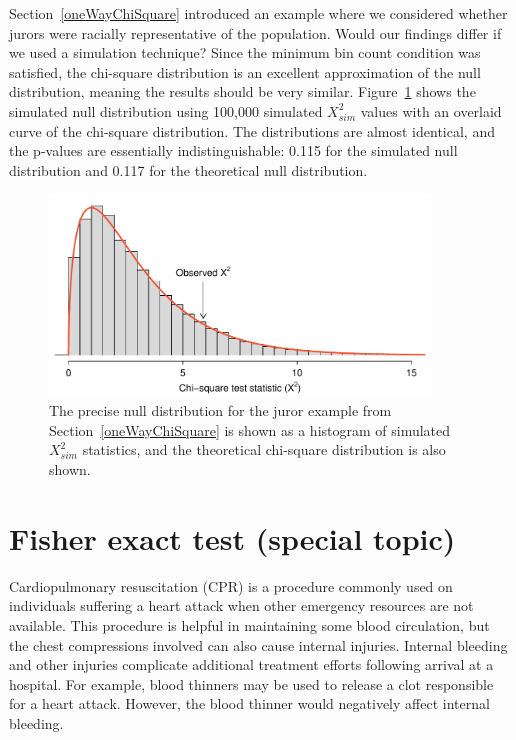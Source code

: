 \begin{example}{Section~\ref{oneWayChiSquare} introduced an example where we considered whether jurors were racially representative of the population. Would our findings differ if we used a simulation technique?}
Since the minimum bin count condition was satisfied, the chi-square distribution is an excellent approximation of the null distribution, meaning the results should be very similar. Figure~\ref{jurorChiSquareSimulated} shows the simulated null distribution using 100,000 simulated $X_{sim}^2$ values with an overlaid curve of the chi-square distribution. The distributions are almost identical, and the p-values are essentially indistinguishable: 0.115 for the simulated null distribution and 0.117 for the theoretical null distribution.
\end{example}

\begin{figure}[h]
\centering
\includegraphics[width=0.9\textwidth]{ch_inference_for_props/figures/jurorChiSquareSimulated/jurorChiSquareSimulated}
\caption{The precise null distribution for the juror example from Section~\ref{oneWayChiSquare} is shown as a histogram of simulated $X_{sim}^2$ statistics, and the theoretical chi-square distribution is also shown.}
\label{jurorChiSquareSimulated}
\end{figure}


\section{Fisher exact test (special topic)}
\label{smallSampleHTForTwoOrMoreProportion}



Cardiopulmonary resuscitation (CPR) is a procedure commonly used on individuals suffering a heart attack when other emergency resources are not available. This procedure is helpful in maintaining some blood circulation, but the chest compressions involved can also cause internal injuries. Internal bleeding and other injuries complicate additional treatment efforts following arrival at a hospital. For example, blood thinners may be used to release a clot responsible for a heart attack. However, the blood thinner would negatively affect internal bleeding.

